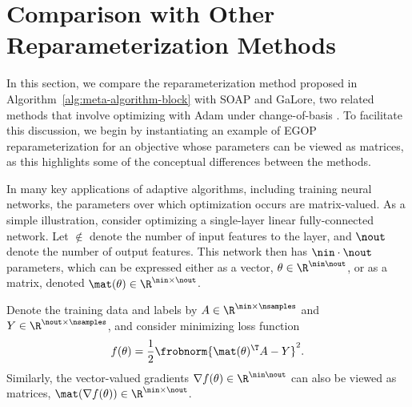 \section{Comparison with Other Reparameterization Methods}\label{sec:compare-w-SOAP-Galore}

    In this section, we compare the reparameterization method proposed in Algorithm~\ref{alg:meta-algorithm-block} with SOAP and GaLore, two related methods that involve optimizing with Adam under change-of-basis \cite{vyas2024soap, zhao2024galore, maes2024understanding}. To facilitate this discussion, we begin by instantiating an example of EGOP reparameterization for an objective whose parameters can be viewed as matrices, as this highlights some of the conceptual differences between the methods.

    In many key applications of adaptive algorithms, including training neural networks, the parameters over which optimization occurs are matrix-valued. As a simple illustration, consider optimizing a single-layer linear fully-connected network. Let $\nin$ denote the number of input features to the layer, and $\nout$ denote the number of output features. This network then has $\nin\cdot\nout$ parameters, which can be expressed either as a vector, $\theta\in \R^{\nin\nout}$, or as a matrix, denoted $\mat(\theta)\in\R^{\nin\times \nout}$.
    
    Denote the training data and labels by $A \in \R^{\nin\times\nsamples}$ and $Y \in \R^{\nout \times \nsamples}$, and consider minimizing loss function
    \[
        f(\theta) = \frac{1}{2}\frobnorm{\mat(\theta)^\T A - Y}^2.
    \]
    Similarly, the vector-valued gradients $\nabla f(\theta) \in \R^{\nin \nout}$ can also be viewed as matrices, $\mat(\nabla f(\theta)) \in \R^{\nin\times \nout}$.
    
